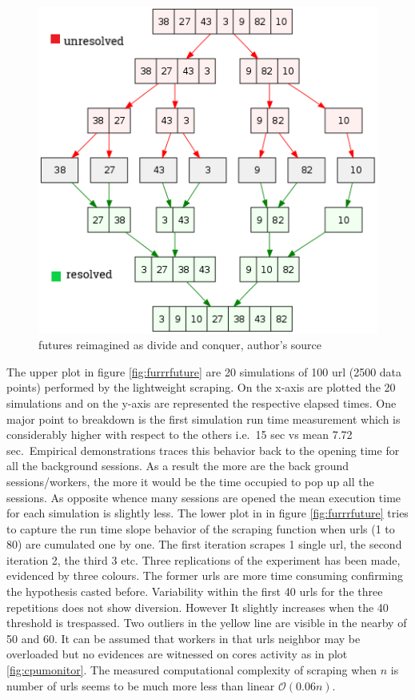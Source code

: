 \documentclass[
  12pt,
  a4paper,
  oneside]{book}
\theoremstyle{definition}
\theoremstyle{definition}
\theoremstyle{definition}
\theoremstyle{remark}
\begin{document}
\begin{figure}
\centering
\includegraphics{images/divideconquer.png}
\caption{\label{fig:divideconquer}futures reimagined as divide and conquer, author's source}
\end{figure}

The upper plot in figure \ref{fig:furrrfuture} are 20 simulations of 100 url (2500 data points) performed by the lightweight scraping. On the x-axis are plotted the 20 simulations and on the y-axis are represented the respective elapsed times. One major point to breakdown is the first simulation run time measurement which is considerably higher with respect to the others i.e.~15 sec vs mean 7.72 sec.~Empirical demonstrations traces this behavior back to the opening time for all the background sessions. As a result the more are the back ground sessions/workers, the more it would be the time occupied to pop up all the sessions. As opposite whence many sessions are opened the mean execution time for each simulation is slightly less.
The lower plot in in figure \ref{fig:furrrfuture} tries to capture the run time slope behavior of the scraping function when urls (1 to 80) are cumulated one by one. The first iteration scrapes 1 single url, the second iteration 2, the third 3 etc. Three replications of the experiment has been made, evidenced by three colours. The former urls are more time consuming confirming the hypothesis casted before. Variability within the first 40 urls for the three repetitions does not show diversion. However It slightly increases when the 40 threshold is trespassed. Two outliers in the yellow line are visible in the nearby of 50 and 60. It can be assumed that workers in that urls neighbor may be overloaded but no evidences are witnessed on cores activity as in plot \ref{fig:cpumonitor}. The measured computational complexity of scraping when \(n\) is number of urls seems to be much more less than linear \(\mathcal{O}(0.06n)\).
\end{document}
